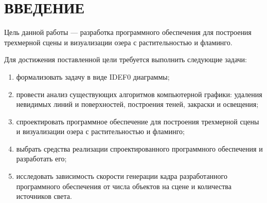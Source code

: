 \chapter*{ВВЕДЕНИЕ}


Цель данной работы --- разработка программного обеспечения для построения трехмерной сцены и визуализации озера с растительностью и фламинго.

Для достижения поставленной цели требуется выполнить следующие задачи:
\begin{enumerate}[label=\arabic*)]
	\item формализовать задачу в виде IDEF0 диаграммы;
	\item провести анализ существующих алгоритмов компьютерной графики: удаления невидимых линий и поверхностей, построения теней, закраски и освещения;
	\item спроектировать программное обеспечение для построения трехмерной сцены и визуализации озера с растительностью и фламинго;
	\item выбрать средства реализации спроектированного программного обеспечения и разработать его;
	\item исследовать зависимость скорости генерации кадра разработанного программного обеспечения от числа объектов на сцене и количества источников света.
\end{enumerate} 